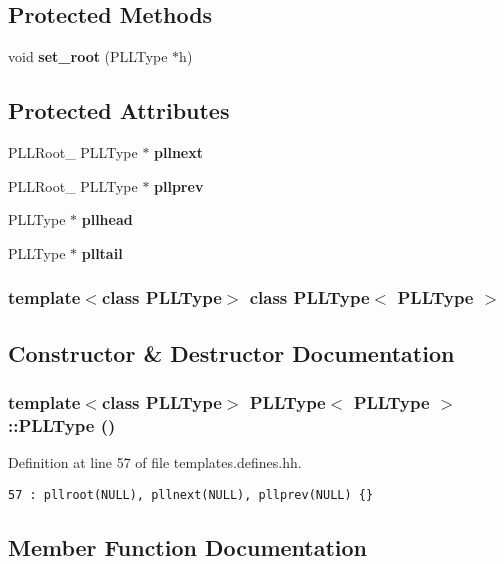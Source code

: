 \subsection*{Protected Methods}
\begin{CompactItemize}
\item 
void {\bf set\_\-root} (PLLType $\ast$h)
\end{CompactItemize}
\subsection*{Protected Attributes}
\begin{CompactItemize}
\item 
PLLRoot\_\- PLLType $\ast$ {\bf pllnext}
\item 
PLLRoot\_\- PLLType $\ast$ {\bf pllprev}
\item 
PLLType $\ast$ {\bf pllhead}
\item 
PLLType $\ast$ {\bf plltail}
\end{CompactItemize}
\subsubsection*{template$<$class PLLType$>$ class PLLType$<$ PLLType $>$}



\subsection{Constructor \& Destructor Documentation}
\subsubsection{\setlength{\rightskip}{0pt plus 5cm}template$<$class PLLType$>$ PLLType$<$ PLLType $>$::PLLType ()\hspace{0.3cm}{\tt  [inline]}}\label{classPLLType_a0}




Definition at line 57 of file templates.defines.hh.



\footnotesize\begin{verbatim}57 : pllroot(NULL), pllnext(NULL), pllprev(NULL) {} 
\end{verbatim}\normalsize 


\subsection{Member Function Documentation}
